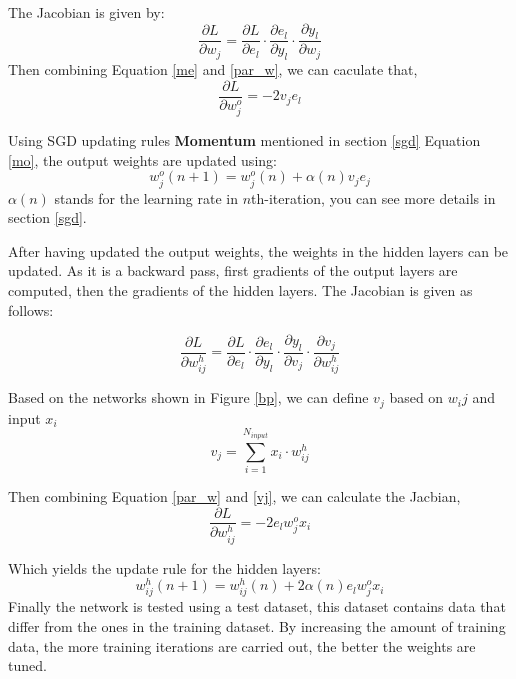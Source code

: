     The Jacobian is given by:
    \begin{equation}
        \frac{\partial L}{\partial w_{j}} = \frac{\partial L}{\partial e_l} \cdot \frac{\partial e_l}{\partial y_l} \cdot \frac{\partial y_l}{\partial w_{j}}
        \label{par_w}
    \end{equation}
    Then combining Equation \ref{me} and \ref{par_w}, we can caculate that,
    \begin{equation}
        \frac{\partial L}{\partial w^{o}_{j}} = -2v_j e_l
    \end{equation}

    Using SGD updating rules \textbf{Momentum} mentioned in section \ref{sgd} Equation \ref{mo}, the output weights are updated using:
    \begin{equation}
        w^{o}_{j}(n+1) = w^{o}_{j}(n) + \alpha(n)v_j e_j
    \end{equation}
    $\alpha(n)$ stands for the learning rate in $n$th-iteration, you can see more details in section \ref{sgd}.

    After having updated the output weights, the weights in the hidden layers can be updated. As it is a backward pass, first gradients of the output layers are computed, then the gradients of the hidden layers. The Jacobian is given as follows:

    \begin{equation}
        \frac{\partial L}{\partial w^{h}_{ij}} = \frac{\partial L}{\partial e_l} \cdot \frac{\partial e_l}{\partial y_l} \cdot \frac{\partial y_l}{\partial v_{j}} \cdot \frac{\partial v_j}{\partial w^{h}_{ij}}
        \label{par_w}
    \end{equation}

    Based on the networks shown in Figure \ref{bp}, we can define $v_j$ based on $w_ij$ and input $x_i$
    \begin{equation}
        v_j = \sum_{i=1}^{N_{input}}x_i\cdot w^{h}_{ij}
        \label{vj}
    \end{equation}


    Then combining Equation \ref{par_w} and \ref{vj}, we can calculate the Jacbian,
    \begin{equation}
        \frac{\partial L}{\partial w_{ij}^{h}} = -2e_l w_j^{o} x_i
    \end{equation} 

    Which yields the update rule for the hidden layers:
    \begin{equation}
        w_{ij}^{h}(n+1) = w_{ij}^{h}(n)+ 2\alpha(n)e_l w_j^{o} x_i
    \end{equation}
    Finally the network is tested using a test dataset, this dataset contains data that differ from the ones in the training dataset. By increasing the amount of training data, the more training iterations are carried out, the better the weights are tuned.

